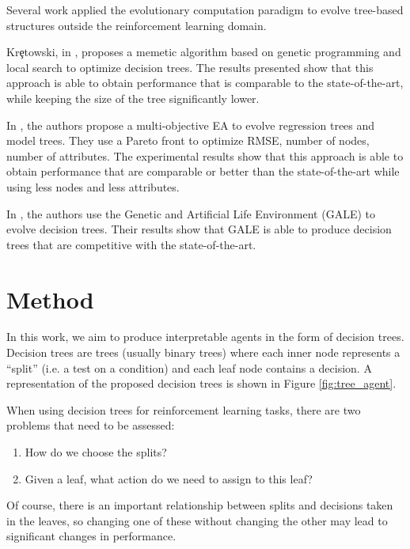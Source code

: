 \documentclass[review,english]{elsarticle}
\begin{document}
Several work applied the evolutionary computation paradigm to evolve tree-based structures outside the reinforcement learning domain.

Kr\c{e}towski, in \cite{kretowski_memetic_2008}, proposes a memetic algorithm based on genetic programming \cite{koza_genetic_1992} and local search to optimize decision trees.
The results presented show that this approach is able to obtain performance that is comparable to the state-of-the-art, while keeping the size of the tree significantly lower.

In \cite{czajkowski_multi-objective_2019}, the authors propose a multi-objective EA to evolve regression trees and model trees.
They use a Pareto front to optimize RMSE, number of nodes, number of attributes.
The experimental results show that this approach is able to obtain performance that are comparable or better than the state-of-the-art while using less nodes and less attributes.

In \cite{llora_evolution_nodate, llora_knowledge-independent_nodate}, the authors use the Genetic and Artificial Life Environment (GALE) to evolve decision trees. Their results show that GALE is able to produce decision trees that are competitive with the state-of-the-art.

\section{Method}
\label{sec:method}
In this work, we aim to produce interpretable agents in the form of decision trees.
Decision trees are trees (usually binary trees) where each inner node represents a ``split'' (i.e. a test on a condition) and each leaf node contains a decision.
A representation of the proposed decision trees is shown in Figure \ref{fig:tree_agent}.

When using decision trees for reinforcement learning tasks, there are two problems that need to be assessed:
\begin{enumerate}
    \item How do we choose the splits?
    \item Given a leaf, what action do we need to assign to this leaf?
\end{enumerate}
Of course, there is an important relationship between splits and decisions taken in the leaves, so changing one of these without changing the other may lead to significant changes in performance.
\end{document}
